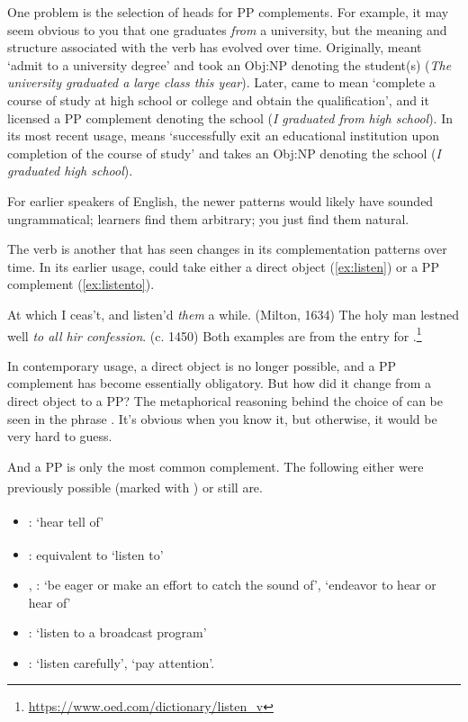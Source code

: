 One problem is the selection of heads for PP complements. For example, it may
seem obvious to you that one graduates \emph{from} a university, but the meaning and
structure associated with the verb  has evolved over time. Originally,
 meant `admit to a university degree' and took an Obj:NP denoting the
student(s) (\textit{The university graduated \emph{a large class} this year}). Later,  came
to mean `complete a course of study at high school or college and obtain the qualification', and it licensed a  PP complement denoting the school (\textit{I graduated
\emph{from high school}}). In its most recent usage,  means `successfully
exit an educational institution upon completion of the course of study' and takes
an Obj:NP denoting the school (\textit{I graduated \emph{high school}}).

For earlier speakers of English, the newer patterns would likely have sounded ungrammatical;
learners find them arbitrary; you just find them natural.


The verb  is another that has seen changes in its complementation patterns over time. In its earlier usage,  could take either a direct object (\ref{ex:listen}) or
a  PP complement (\ref{ex:listento}).

\ea At which I ceas't, and listen'd \emph{them} a while. (Milton, 1634)\label{ex:listen}
\ex The holy man lestned well \emph{to all hir confession}. (c. 1450)\label{ex:listento}
\z
\noindent Both examples are from the  entry for .\footnote{\url{https://www.oed.com/dictionary/listen_v}}
    
In contemporary usage, a direct object is no longer possible, and a  PP complement has become essentially obligatory. But how did it change from a direct
object to a  PP? The metaphorical reasoning behind the choice of  can be seen
in the phrase . It's obvious when you know it, but otherwise, it would
be very hard to guess. 

And a  PP is only the most common complement. The following either were previously possible (marked with \textsuperscript{\dag}) or still are.

\begin{itemize}[noitemsep]
    \item \textsuperscript{\dag}: `hear tell of'
    \item \textsuperscript{\dag}: equivalent to `listen to'
    \item {}, : `be eager or make an effort to catch the sound of', `endeavor to hear or hear of'
    \item {}: `listen to a broadcast program'
    \item {}: `listen carefully', `pay attention'.
\end{itemize}

